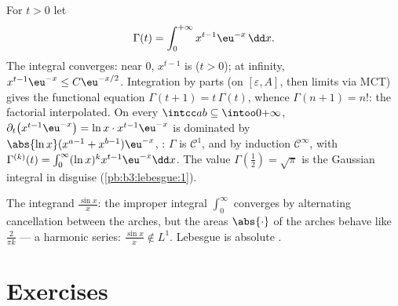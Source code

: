 \begin{example}\label{ex:b3:lebesgue:gamma}
For $t > 0$ let
\[
\Gamma(t) = \int_0^{+\infty} x^{t-1}\eu^{-x}\,\dd x .
\]
The integral converges: near $0$, $x^{t-1}$ is  ($t >
0$); at infinity, $x^{t-1}\eu^{-x} \leq C\eu^{-x/2}$.
Integration by parts (on $[\varepsilon, A]$, then limits via
MCT) gives the functional equation $\Gamma(t + 1) =
t\,\Gamma(t)$, whence $\Gamma(n+1) = n!$: the factorial
interpolated. On every $\intcc ab \subseteq \intoo0{+\infty}$,
$\partial_t\bigl(x^{t-1}\eu^{-x}\bigr) = \ln
x\cdot x^{t-1}\eu^{-x}$ is dominated by $\abs{\ln x}(x^{a-1} +
x^{b-1})\eu^{-x}$, : $\Gamma$ is $\mathcal C^1$, and
by induction $\mathcal C^\infty$, with $\Gamma^{(k)}(t) =
\int_0^\infty(\ln x)^kx^{t-1}\eu^{-x}\dd x$. The value
$\Gamma(\frac12) = \sqrt\pi$ is the Gaussian integral in
disguise (\cref{pb:b3:lebesgue:1}).
\end{example}

\begin{omfigure}

{\small The integrand $\frac{\sin x}x$: the improper integral
$\int_0^\infty$ converges by alternating cancellation between
the arches, but the areas $\abs{\cdot}$ of the arches behave
like $\frac2{\pi k}$ --- a harmonic series: $\frac{\sin x}x
\notin L^1$. Lebesgue  is absolute .}
\end{omfigure}

\section{Exercises}

